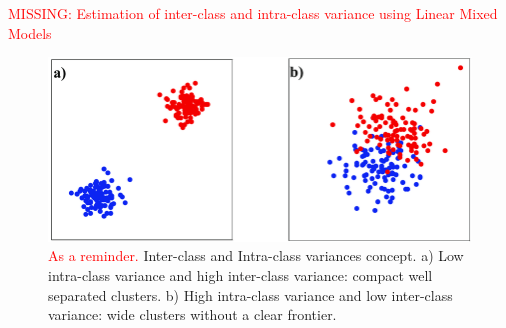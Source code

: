 


\textcolor{red}{MISSING: Estimation of inter-class and intra-class variance using Linear Mixed Models}
\begin{figure}[H]
    \centering
    \includegraphics[width=0.5\linewidth]{figures/chapter_2/temp.png}
    \caption{\textcolor{red}{As a reminder.} Inter-class and Intra-class variances concept. a) Low intra-class variance and high inter-class variance: compact well separated clusters. b) High intra-class variance and low inter-class variance: wide clusters without a clear frontier. }
    \label{fig:temp}
\end{figure}

